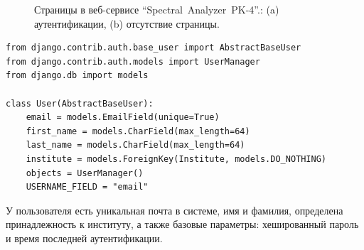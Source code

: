 \begin{figure}[t]
    \begin{center}
         \hspace{0.05\columnwidth}
         \caption{Страницы в веб-сервисе “Spectral~Analyzer~PK-4”.: \pt(a) аутентификации, \pt(b) отсутствие страницы.}
         \label{fig:auth_and_page_not_found}
    \end{center}
\end{figure}

\begin{lstlisting}[style=py]
from django.contrib.auth.base_user import AbstractBaseUser
from django.contrib.auth.models import UserManager
from django.db import models

class User(AbstractBaseUser):
    email = models.EmailField(unique=True)
    first_name = models.CharField(max_length=64)
    last_name = models.CharField(max_length=64)
    institute = models.ForeignKey(Institute, models.DO_NOTHING)
    objects = UserManager()
    USERNAME_FIELD = "email"
\end{lstlisting}
У пользователя есть уникальная почта в системе, имя и фамилия, определена принадлежность к институту,
а также базовые параметры: хешированный пароль и время последней аутентификации.

